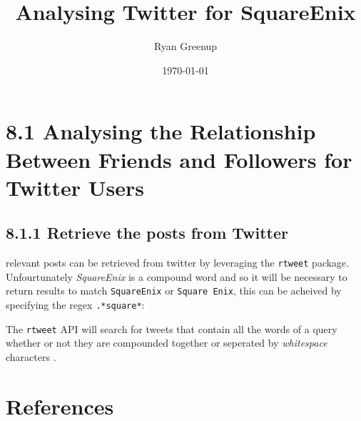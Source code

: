 \documentclass[11pt]{article}
\author{Ryan Greenup}
\date{\today}
\title{Analysing Twitter for SquareEnix}
\begin{document}
\maketitle
\tableofcontents



\section{8.1 Analysing the Relationship Between Friends and Followers for Twitter Users}
\label{sec:org9c03e62}
\subsection{8.1.1 Retrieve the posts from Twitter}
\label{sec:orgd718371}
relevant posts can be retrieved from twitter by leveraging the \texttt{rtweet} package. Unfourtunately \emph{SquareEnix} is a compound word and so it will be necessary to return results to match \texttt{SquareEnix} or \texttt{Square Enix}, this can be acheived by specifying the regex \texttt{.*square*}:

The \texttt{rtweet} API will search for tweets that contain all the words of a query whether or not they are compounded together or seperated by \emph{whitespace} characters \cite{kearney2019}.


\section{References}
\label{sec:orgb0d8e9b}
\end{document}
